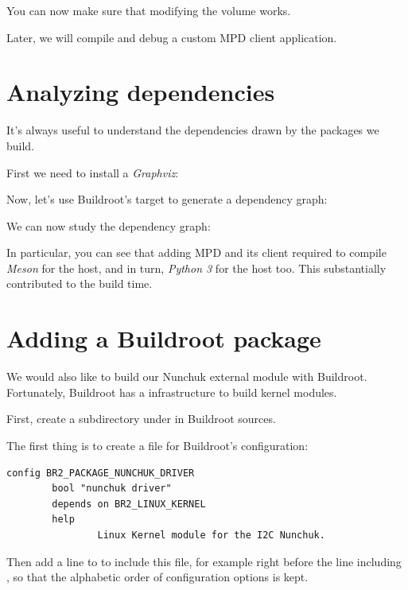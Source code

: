 
You can now make sure that modifying the volume works.

Later, we will compile and debug a custom MPD client application.

\section{Analyzing dependencies}

It's always useful to understand the dependencies drawn by the
packages we build.

First we need to install a {\em Graphviz}:


Now, let's use Buildroot's target to generate a
dependency graph:


We can now study the dependency graph:


In particular, you can see that adding MPD and its client
required to compile {\em Meson} for the host, and in turn,
{\em Python 3} for the host too. This substantially contributed to the
build time.

\section{Adding a Buildroot package}

We would also like to build our Nunchuk external module with Buildroot.
Fortunately, Buildroot has a  infrastructure
to build kernel modules.

First, create a  subdirectory under 
in Buildroot sources.

The first thing is to create a  file
for Buildroot's configuration:

\begin{verbatim}
config BR2_PACKAGE_NUNCHUK_DRIVER
        bool "nunchuk driver"
        depends on BR2_LINUX_KERNEL
        help
                Linux Kernel module for the I2C Nunchuk.
\end{verbatim}

Then add a line to  to include this file, for example right
before the line including ,
so that the alphabetic order of configuration options is kept.

